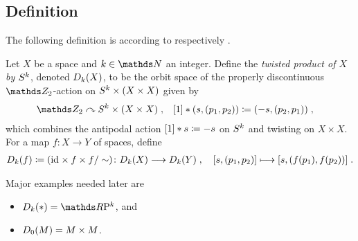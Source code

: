 \subsection{Definition}\label{sec:twistedproddef}
The following definition is according to
\cite[p.~83]{immersionconj} respectively 
\cite[compare~§4, Def./ of $P(m;X)$]{brown}.
\begin{Def}
  Let $X$ be a space and $k\in\Nat$ an integer.
  Define the \emph{twisted product of $X$ by $S^{k}$}, denoted
  $D_{k}({X})$, to be the orbit space of the properly
  discontinuous $\Zmod2$-action on $S^{k}\times(X\times X)$ given
  by
  \begin{align*}
    \Zmod2 &\leftgroupaction \Twistedprodcovspace{k}{X}
             \;,
    &[1] \actson (s, (p_1,p_2)) &\coloneqq (-s, (p_2, p_1))
                                  \;,
  \end{align*}
  which combines the antipodal action $[1]\ast s\coloneqq -s$ on
  $S^{k}$ and twisting on $X\times X$.
  For a map $f\colon X\to Y$ of spaces, define
  \begin{gather*}
    D_{k}({f})\coloneqq (\mathrm{id}_{}\times f\times f/\sim)\colon
    D_{k}({X})\longrightarrow D_{k}({Y})
    \;,\quad
    [s,(p_1,p_2)] \longmapsto [s,(f(p_1),f(p_2))]
    \;.
  \end{gather*}
\end{Def}
\begin{Ex}
  Major examples needed later are
  \begin{itemize}
  \item $\Twistedprod k {\pt} = \RP k$, and
  \item $D_{0}({M}) = M\times M$.
  \end{itemize}
\end{Ex}

